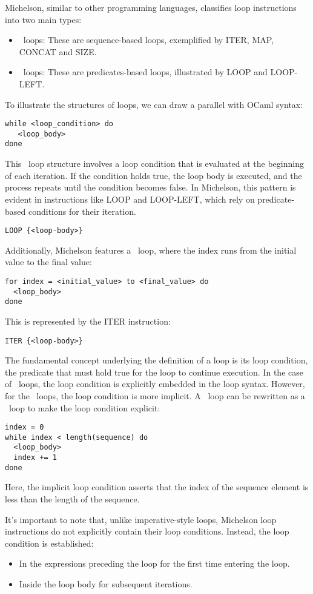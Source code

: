 \documentclass[a4paper,UKenglish,cleveref, autoref, thm-restate]{lipics-v2021}
\begin{document}
Michelson, similar to other programming languages, classifies loop instructions into two main types:
\begin{itemize}
\item \KFOR\ loops: These are sequence-based loops, exemplified by ITER, MAP, CONCAT and SIZE.
\item \KWHILE\ loops: These are predicates-based loops, illustrated by LOOP and LOOP-LEFT.
\end{itemize}
To illustrate the structures of  loops, we can draw a parallel with OCaml syntax:
\begin{verbatim}
while <loop_condition> do
   <loop_body>
done
\end{verbatim}
This \KWHILE\  loop structure involves a loop condition that is evaluated at the beginning of each iteration. If the condition holds true, the loop body is executed, and the process repeats until the condition becomes false.  In Michelson, this pattern is evident in instructions like LOOP and LOOP-LEFT, which rely on predicate-based conditions for their iteration.
\begin{verbatim}
LOOP {<loop-body>}
\end{verbatim}
Additionally, Michelson features a \KFOR\ loop, where the index runs from the initial value to the final value:
\begin{verbatim}
for index = <initial_value> to <final_value> do
  <loop_body>
done
\end{verbatim}
This is represented by the ITER instruction:
\begin{verbatim}
ITER {<loop-body>}
\end{verbatim}

The fundamental concept underlying the definition of a loop is its loop condition, the predicate that must hold true for the loop to continue execution. In the case of \KWHILE\ loops, the  loop condition is explicitly embedded in the loop syntax. However, for the \KFOR\  loops, the loop condition is more implicit. A \KFOR\  loop can be rewritten as a  \KWHILE\ loop to make the  loop condition explicit: 
\begin{verbatim}
index = 0
while index < length(sequence) do
  <loop_body>
  index += 1
done
\end{verbatim}
Here, the implicit loop condition asserts that the index of the sequence element is less than the length of the sequence.

It's important  to note that, unlike imperative-style loops, Michelson loop instructions do not explicitly contain their loop conditions. Instead, the  loop condition is established:
\begin{itemize}
 \item In the expressions preceding the loop for the first time entering the loop.
 \item Inside the loop body for subsequent iterations.
\end{itemize}
\end{document}
